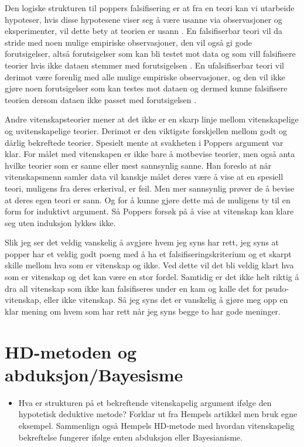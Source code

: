 \documentclass[
]{book}
\providecommand{\tightlist}{%
  \setlength{\itemsep}{0pt}\setlength{\parskip}{0pt}}
\begin{document}
Den logiske strukturen til poppers falsifisering er at fra en teori kan vi utarbeide hypoteser, hvis disse hypotesene viser seg å være usanne via observasjoner og eksperimenter, vil dette bety at teorien er usann \citet{okasha2016}.
En falsifiserbar teori vil da stride med noen mulige empiriske observasjoner, den vil også gi gode forutsigelser, altså forutsigelser som kan bli testet mot data og som vill falsifisere teorier hvis ikke dataen stemmer med forutsigelsen \citet{okasha2016}.
En ufalsifiserbar teori vil derimot være forenlig med alle mulige empiriske observasjoner, og den vil ikke gjøre noen forutsigelser som kan testes mot dataen og dermed kunne falsifisere teorien dersom dataen ikke passet med forutsigelsen \citet{okasha2016}.

Andre vitenskapsteorier mener at det ikke er en skarp linje mellom vitenskapelige og uvitenskapelige teorier.
Derimot er den viktigste forskjellen mellom godt og dårlig bekreftede teorier.
Spesielt \citet{okasha2016} mente at svakheten i Poppers argument var klar.
For målet med vitenskapen er ikke bare å motbevise teorier, men også anta hvilke teorier som er sanne eller mest sannsynlig sanne.
Han foreslo at når vitenskapsmenn samler data vil kanskje målet deres være å vise at en spesiell teori, muligens fra deres erkerival, er feil.
Men mer sannsynlig prøver de å bevise at deres egen teori er sann.
Og for å kunne gjøre dette må de muligens ty til en form for induktivt argument.
Så Poppers forsøk på å vise at vitenskap kan klare seg uten induksjon lykkes ikke.

Slik jeg ser det veldig vanskelig å avgjøre hvem jeg syns har rett, jeg syns at popper har et veldig godt poeng med å ha et falsifiseringskriterium og et skarpt skille mellom hva som er vitenskap og ikke.
Ved dette vil det bli veldig klart hva som er vitenskap og det kan være en stor fordel.
Samtidig er det ikke helt riktig å dra all vitenskap som ikke kan falsifiseres under en kam og kalle det for psudo- vitenskap, eller ikke vitenskap.
Så jeg syns det er vanskelig å gjøre meg opp en klar mening om hvem som har rett når jeg syns begge to har gode meninger.

\hypertarget{hd-metoden-og-abduksjonbayesisme}{%
\section{HD-metoden og abduksjon/Bayesisme}\label{hd-metoden-og-abduksjonbayesisme}}

\begin{itemize}
\tightlist
\item
  Hva er strukturen på et bekreftende vitenskapelig argument ifølge den hypotetisk deduktive metode?
  Forklar ut fra Hempels artikkel men bruk egne eksempel.
  Sammenlign også Hempels HD-metode med hvordan vitenskapelig bekreftelse fungerer ifølge enten abduksjon eller Bayesianisme.
\end{itemize}
\end{document}
